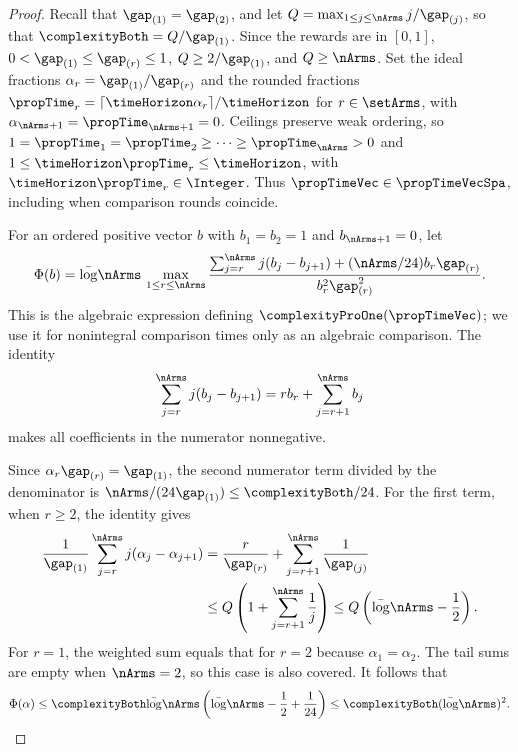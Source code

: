 \begin{proof}%
Recall that $\gap_{(1)}=\gap_{(2)}$, and let
$Q=\max_{1\leq j\leq\nArms}j/\gap_{(j)}$, so that
$\complexityBoth=Q/\gap_{(1)}$. Since the rewards are in $[0,1]$,
$0<\gap_{(1)}\leq\gap_{(r)}\leq1$, $Q\geq2/\gap_{(1)}$, and $Q\geq\nArms$.
Set the ideal fractions $\alpha_r=\gap_{(1)}/\gap_{(r)}$ and the rounded fractions
$\propTime_r=\lceil\timeHorizon\alpha_r\rceil/\timeHorizon$ for
$r\in\setArms$, with $\alpha_{\nArms+1}=\propTime_{\nArms+1}=0$.
Ceilings preserve weak ordering, so
$1=\propTime_1=\propTime_2\geq\cdots\geq\propTime_{\nArms}>0$ and
$1\leq\timeHorizon\propTime_r\leq\timeHorizon$, with
$\timeHorizon\propTime_r\in\Integer$.
Thus $\propTimeVec\in\propTimeVecSpa$, including when comparison rounds coincide.

For an ordered positive vector $b$ with $b_1=b_2=1$ and $b_{\nArms+1}=0$, let
\[
\Phi(b)=\bar\log\nArms\,
\max_{1\leq r\leq\nArms}
\frac{\sum_{j=r}^{\nArms}j(b_j-b_{j+1})
+(\nArms/24)b_r\gap_{(r)}}{b_r^2\gap_{(r)}^2}.
\]
This is the algebraic expression defining $\complexityProOne(\propTimeVec)$;
we use it for nonintegral comparison times only as an algebraic comparison.
The identity
\[
\sum_{j=r}^{\nArms}j(b_j-b_{j+1})
=r b_r+\sum_{j=r+1}^{\nArms}b_j
\]
makes all coefficients in the numerator nonnegative.

Since $\alpha_r\gap_{(r)}=\gap_{(1)}$, the second numerator term divided by
the denominator is $\nArms/(24\gap_{(1)})\leq\complexityBoth/24$.
For the first term, when $r\geq2$, the identity gives
\begin{align*}
\frac{1}{\gap_{(1)}}\sum_{j=r}^{\nArms}j(\alpha_j-\alpha_{j+1})
&=\frac{r}{\gap_{(r)}}+\sum_{j=r+1}^{\nArms}\frac{1}{\gap_{(j)}}\\
&\leq Q\left(1+\sum_{j=r+1}^{\nArms}\frac{1}{j}\right)
\leq Q\left(\bar\log\nArms-\frac12\right).
\end{align*}
For $r=1$, the weighted sum equals that for $r=2$ because $\alpha_1=\alpha_2$.
The tail sums are empty when $\nArms=2$, so this case is also covered.
It follows that
\[
\Phi(\alpha)\leq\complexityBoth\bar\log\nArms
\left(\bar\log\nArms-\frac12+\frac{1}{24}\right)
\leq\complexityBoth(\bar\log\nArms)^2.
\]


\end{proof}
